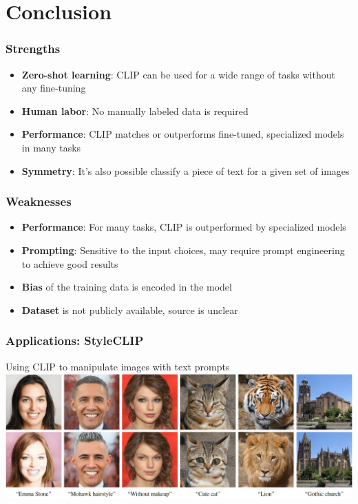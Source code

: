 \section{Conclusion}
\begin{frame}
    \frametitle{Strengths}
    \begin{itemize}
        \item<1-> \textbf{Zero-shot learning}: CLIP can be used for a wide range of tasks without any fine-tuning
        \item<2-> \textbf{Human labor}: No manually labeled data is required
        \item<3-> \textbf{Performance}: CLIP matches or outperforms fine-tuned, specialized models in many tasks
        \item<5-> \textbf{Symmetry}: It's also possible classify a piece of text for a given set of images
    \end{itemize}
\end{frame}

\begin{frame}
    \frametitle{Weaknesses}
    \begin{itemize}
        \item<1-> \textbf{Performance}: For many tasks, CLIP is outperformed by specialized models
        \item<2-> \textbf{Prompting}: Sensitive to the input choices, may require prompt engineering to achieve good results
        \item<3-> \textbf{Bias} of the training data is encoded in the model
        \item<4-> \textbf{Dataset} is not publicly available, source is unclear
    \end{itemize}
\end{frame}

\begin{frame}
    \frametitle{Applications: StyleCLIP}
    Using CLIP to manipulate images with text prompts 
    \includegraphics[width=\textwidth]{./images/teaser}
\end{frame}


